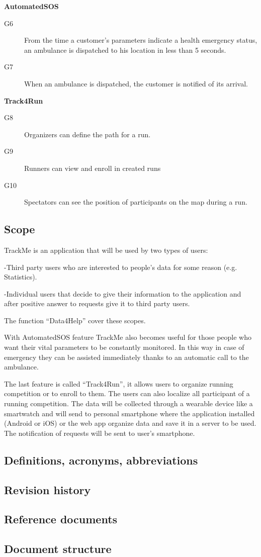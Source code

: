 \documentclass[../main.tex]{subfiles}
\begin{document}
{\bf AutomatedSOS}
\begin{description}
	\item [G6]  From the time a customer's parameters indicate a health emergency status, an ambulance is dispatched to his location in less than 5 seconds.
	\item [G7]  When an ambulance is dispatched, the customer is notified of its arrival.
\end{description}

{\bf Track4Run}
\begin{description}
	\item [G8]  Organizers can define the path for a run.
	\item [G9]  Runners can view and enroll in created runs
	\item [G10] Spectators can see the position of participants on the map during a run.
\end{description}

\subsection{Scope}

TrackMe is an application that will be used by two types of users:

-Third party users who are interested to people’s data for some reason (e.g. Statistics).

-Individual users that decide to give their information to the application and after positive answer to requests give it to third party users.

The function “Data4Help” cover these scopes.

With AutomatedSOS feature TrackMe also becomes useful for those people who want their vital parameters to be constantly monitored. In this way in case of emergency they can be assisted immediately thanks to an automatic call to the ambulance.

The last feature is called “Track4Run”, it allows users to organize running competition or to enroll to them. The users can also localize all participant of a running competition.
The data will be collected through a wearable device like a smartwatch and will send to personal smartphone where the application installed (Android or iOS) or the web app organize data and save it in a server to be used. The notification of requests will be sent to user’s smartphone.
\subsection{Definitions, acronyms, abbreviations}
\subsection{Revision history}
\subsection{Reference documents}
\subsection{Document structure}
\end{document}
